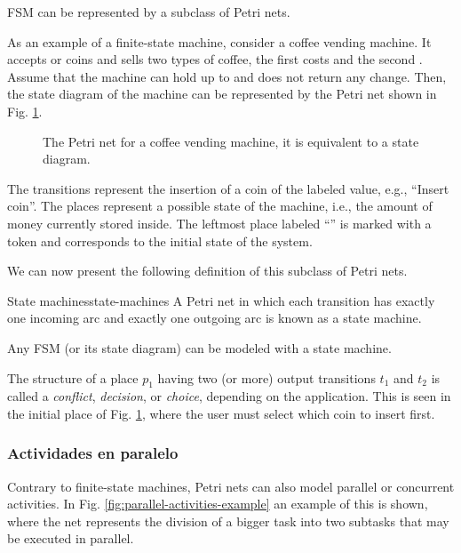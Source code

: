 \acrfull{FSM} can be represented by a subclass of Petri nets.

As an example of a finite-state machine, consider a coffee vending machine.
It accepts  or  coins and sells two types of coffee,
the first costs  and the second .
Assume that the machine can hold up to  and does not return any change.
Then, the state diagram of the machine can be represented
by the Petri net shown in Fig. \ref{fig:state-machine-example}.

\begin{figure}[!htb]
      \centering
      
      \caption{The Petri net for a coffee vending machine, it is equivalent to a state diagram.}
      \label{fig:state-machine-example}
\end{figure}

The transitions represent the insertion of a coin of the labeled value,
e.g., ``Insert  coin''.
The places represent a possible state of the machine,
i.e., the amount of money currently stored inside.
The leftmost place labeled ``'' is marked with a token
and corresponds to the initial state of the system.

We can now present the following definition of this subclass of Petri nets.

\begin{definition}{State machines}{state-machines}
      A Petri net in which each transition has exactly one incoming arc
      and exactly one outgoing arc is known as a state machine.

      Any \acrshort{FSM} (or its state diagram) can be modeled with a state machine.
\end{definition}

The structure of a place $p_1$ having two (or more) output transitions $t_1$ and $t_2$ is called
a \emph{conflict}, \emph{decision}, or \emph{choice}, depending on the application.
This is seen in the initial place of Fig. \ref{fig:state-machine-example},
where the user must select which coin to insert first.

\subsubsection{Actividades en paralelo}

Contrary to finite-state machines, Petri nets can also model parallel or concurrent activities.
In Fig. \ref{fig:parallel-activities-example} an example of this is shown,
where the net represents the division of a bigger task
into two subtasks that may be executed in parallel.

